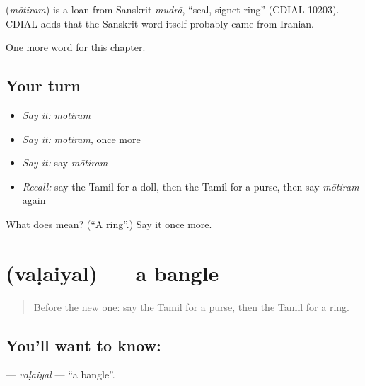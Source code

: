 \begin{cousinweb}
\textbf{} (\emph{mōtiram}) is a loan from Sanskrit \emph{mudrā}, \textquotedblleft{}seal, signet-ring\textquotedblright{} (CDIAL 10203). CDIAL adds that the Sanskrit word itself probably came from Iranian.
\end{cousinweb}

\begin{grammarlens}[title={What you've built}]
One more word for this chapter.
\end{grammarlens}

\subsection*{Your turn}
\begin{itemize}
\raggedright
  \item \emph{Say it:} \emph{mōtiram}
  \item \emph{Say it:} \emph{mōtiram}, once more
  \item \emph{Say it:} say \emph{mōtiram}
  \item \emph{Recall:} say the Tamil for a doll, then the Tamil for a purse, then say \emph{mōtiram} again
\end{itemize}

\begin{tcolorbox}[breakable,colback=teal!4,colframe=teal!35!black,title={Before you move on}]
What does  mean? (\textquotedblleft{}A ring\textquotedblright{}.) Say it once more.
\end{tcolorbox}
\section[\texorpdfstring{\ta{வளையல்} (vaḷaiyal)}{வளையல் (vaḷaiyal)}]{ (vaḷaiyal) — a bangle}

\label{lesson:TA-C137-valaiyal}



\begin{quote}
Before the new one: say the Tamil for a purse, then the Tamil for a ring.
\end{quote}

\subsection*{You'll want to know: }
\textbf{} — \emph{vaḷaiyal} — \textquotedblleft{}a bangle\textquotedblright{}.


